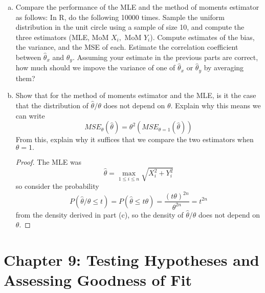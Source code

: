 \documentclass{article}
\begin{document}
\begin{enumerate}
\begin{enumerate}[(a)]
			\item Compare the performance of the MLE and the method of moments estimator as follows: In R, do the following 10000 times. Sample the uniform distribution in the unit circle using a sample of size 10, and compute the three estimators (MLE, MoM $X_i,$ MoM $Y_i$). Compute estimates of the bias, the variance, and the MSE of each. Estimate the correlation coefficient between $\hat{\theta}_x$ and $\hat{\theta}_y.$ Assuming your estimate in the previous parts are correct, how much should we impove the variance of one of $\hat{\theta}_x$ or $\hat{\theta}_y$ by averaging them?

			\item Show that for the method of moments estimator and the MLE, is it the case that the distribution of $\hat{\theta}/\theta$ does not depend on $\theta.$ Explain why this means we can write \[MSE_\theta(\hat{\theta})=\theta^2\left( MSE_{\theta=1}(\hat{\theta}) \right)\] From this, explain why it suffices that we compare the two estimators when $\theta=1.$
				\begin{proof}
					The MLE was \[\hat{\theta}=\max_{1\le i\le n}\sqrt{X_i^2+Y_i^2}\] so consider the probability \[P(\hat{\theta}/\theta \le t) = P(\hat{\theta}\le t\theta) = \frac{(t\theta)^{2n}}{\theta^{2n}} = t^{2n}\] from the density derived in part (c), so the density of $\hat{\theta}/\theta$ does not depend on $\theta.$ 
				\end{proof}
				
		\end{enumerate}
		
\end{enumerate}

\section*{Chapter 9: Testing Hypotheses and Assessing Goodness of Fit}
\end{document}
